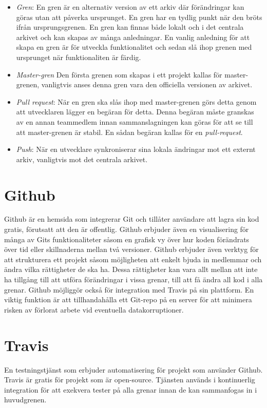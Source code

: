 \begin{itemize}
	\item \textit{Gren}: En gren är en alternativ version av ett arkiv där förändringar kan göras utan att påverka ursprunget. En gren har en tydlig punkt när den bröts ifrån ursprungsgrenen. En gren kan finnas både lokalt och i det centrala arkivet och kan skapas av många anledningar. En vanlig anledning för att skapa en gren är för utveckla funktionalitet och sedan slå ihop grenen med ursprunget när funktionaliten är färdig.

	\item\textit{Master-gren} Den första grenen som skapas i ett projekt kallas för master-grenen, vanligtvis anses denna gren vara den officiella versionen av arkivet.

	\item \textit{Pull request}: När en gren ska slås ihop med master-grenen görs detta genom att utvecklaren lägger en begäran för detta. Denna begäran måste granskas av en annan teammedlem innan sammanslagningen kan göras för att se till att master-grenen är stabil. En sådan begäran kallas för en \textit{pull-request}.

	\item \textit{Push}: När en utvecklare synkroniserar sina lokala ändringar mot ett externt arkiv, vanligtvis mot det centrala arkivet.
\end{itemize}


\section{Github}
Github är en hemsida som integrerar Git och tillåter användare att lagra sin kod gratis, förutsatt att den är offentlig. Github erbjuder även en visualisering för många av Gits funktionaliteter såsom en grafisk vy över hur koden förändrats över tid eller skillnaderna mellan två versioner. Github erbjuder även verktyg för att strukturera ett projekt såsom möjligheten att enkelt bjuda in medlemmar och ändra vilka rättigheter de ska ha. Dessa rättigheter kan vara allt mellan att inte ha tillgång till att utföra förändringar i vissa grenar, till att få ändra all kod i alla grenar. Github möjliggör också för integration med Travis på sin plattform. En viktig funktion är att tillhandahålla ett Git-repo på en server för att minimera risken av förlorat arbete vid eventuella datakorruptioner.~\cite{Github}

\section{Travis}
En testningstjänst som erbjuder automatisering för projekt som använder Github. Travis är gratis för projekt som är open-source. Tjänsten används i kontinuerlig integration för att exekvera tester på alla grenar innan de kan sammanfogas in i huvudgrenen.~\cite{Travis}

